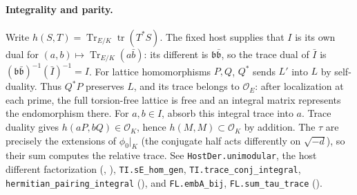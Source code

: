\paragraph{Integrality and parity.}\label{r14:lat-integral}
Write $h(S,T)=\operatorname{Tr}_{E/K}\operatorname{tr}(T^*S)$.
The fixed host supplies that $I$ is its own dual for
$(a,b)\mapsto\operatorname{Tr}_{E/K}(a\bar b)$: its different is
$\mathfrak b\bar{\mathfrak b}$, so the trace dual of $\bar I$ is
$(\mathfrak b\bar{\mathfrak b})^{-1}(\bar I)^{-1}=I$.
For lattice homomorphisms $P,Q$, $Q^*$ sends $L'$ into $L$ by
self-duality. Thus $Q^*P$ preserves $L$, and its trace belongs to
$\mathcal O_E$: after localization at each prime, the full torsion-free
lattice is free and an integral matrix represents the endomorphism there.
For $a,b\in I$, absorb this integral trace into $a$. Trace duality gives
$h(aP,bQ)\in\mathcal O_K$, hence $h(M,M)\subset\mathcal O_K$ by addition.
The $\tau$ are precisely the extensions of $\phi_0|_K$ (the conjugate half
acts differently on $\sqrt{-d}$), so their sum computes the relative trace.
See \nolinkurl{HostDer.unimodular}, the host different factorization
(,
),
\nolinkurl{TI.sE_hom_gen}, \nolinkurl{TI.trace_conj_integral},
\nolinkurl{hermitian_pairing_integral}
(), and
\nolinkurl{FL.embA_bij}, \nolinkurl{FL.sum_tau_trace}
().

